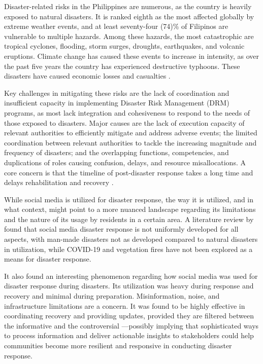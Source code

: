 \documentclass[12pt,a4paper]{report}
\begin{document}
Disaster-related risks in the Philippines are numerous, as the country is
heavily exposed to natural disasters. It is ranked eighth as the most affected
globally by extreme weather events, and at least seventy-four (74)\% of
Filipinos are vulnerable to multiple hazards. Among these hazards, the most
catastrophic are tropical cyclones, flooding, storm surges, droughts,
earthquakes, and volcanic eruptions. Climate change has caused these events to
increase in intensity, as over the past five years the country has experienced
destructive typhoons. These disasters have caused economic losses and
casualties \parencite{worldbank2023}.

Key challenges in mitigating these risks are the lack of coordination and
insufficient capacity in implementing Disaster Risk Management (DRM) programs,
as most lack integration and cohesiveness to respond to the needs of those
exposed to disasters. Major causes are the lack of execution capacity of
relevant authorities to efficiently mitigate and address adverse events; the
limited coordination between relevant authorities to tackle the increasing
magnitude and frequency of disasters; and the overlapping functions,
competencies, and duplications of roles causing confusion, delays, and
resource misallocations. A core concern is that the timeline of post-disaster
response takes a long time and delays rehabilitation and recovery
\parencite{worldbank2023}.

While social media is utilized for disaster response, the way it is utilized,
and in what context, might point to a more nuanced landscape regarding its
limitations and the nature of its usage by residents in a certain area. A
literature review by \parencite{inferio2025} found that social media disaster
response is not uniformly developed for all aspects, with man-made disasters
not as developed compared to natural disasters in utilization, while COVID-19
and vegetation fires have not been explored as a means for disaster response.

It also found an interesting phenomenon regarding how social media was used for
disaster response during disasters. Its utilization was heavy during response
and recovery and minimal during preparation. Misinformation, noise, and
infrastructure limitations are a concern. It was found to be highly effective
in coordinating recovery and providing updates, provided they are filtered
between the informative and the controversial \parencite{inferio2025}---possibly
implying that sophisticated ways to process information and deliver actionable
insights to stakeholders could help communities become more resilient and
responsive in conducting disaster response.
\end{document}
